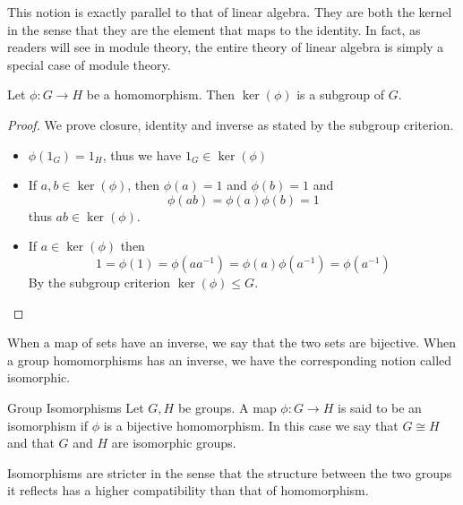 \documentclass[a4paper]{article}
\begin{document}
This notion is exactly parallel to that of linear algebra. They are both the kernel in the sense that they are the element that maps to the identity. In fact, as readers will see in module theory, the entire theory of linear algebra is simply a special case of module theory. 

\begin{prp}{}{} Let $\phi:G\to H$ be a homomorphism. Then $\ker(\phi)$ is a subgroup of $G$. \tcbline
\begin{proof}
We prove closure, identity and inverse as stated by the subgroup criterion. 
\begin{itemize}
\item $\phi(1_G)=1_H$, thus we have $1_G\in\ker(\phi)$
\item If $a,b\in\ker(\phi)$, then $\phi(a)=1$ and $\phi(b)=1$ and $$\phi(ab)=\phi(a)\phi(b)=1$$ thus $ab\in\ker(\phi)$. 
\item If $a\in\ker(\phi)$ then $$1=\phi(1)=\phi(aa^{-1})=\phi(a)\phi(a^{-1})=\phi(a^{-1})$$ By the subgroup criterion $\ker(\phi)\leq G$. 
\end{itemize}
\end{proof}
\end{prp}

When a map of sets have an inverse, we say that the two sets are bijective. When a group homomorphisms has an inverse, we have the corresponding notion called isomorphic. 

\begin{defn}{Group Isomorphisms}{} Let $G,H$ be groups. A map $\phi:G\to H$ is said to be an isomorphism if $\phi$ is a bijective homomorphism. In this case we say that $G\cong H$ and that $G$ and $H$ are isomorphic groups. 
\end{defn}

Isomorphisms are stricter in the sense that the structure between the two groups it reflects has a higher compatibility than that of homomorphism. 
\end{document}
